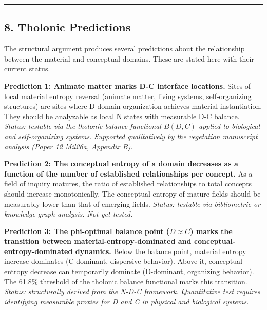 \documentclass[
  11pt,
  letterpaper,
]{article}
\begin{document}
\begin{center}\rule{0.5\linewidth}{0.5pt}\end{center}

\subsection{8. Tholonic Predictions}\label{tholonic-predictions}

The structural argument produces several predictions about the
relationship between the material and conceptual domains. These are
stated here with their current status.

\textbf{Prediction 1: Animate matter marks D-C interface locations.}
Sites of local material entropy reversal (animate matter, living
systems, self-organizing structures) are sites where D-domain
organization achieves material instantiation. They should be analyzable
as local N states with measurable D-C balance. \emph{Status: testable
via the tholonic balance functional \(B(D,C)\) applied to biological and
self-organizing systems. Supported qualitatively by the vegetation
manuscript analysis
(\href{https://github.com/baardev/truevalue/blob/main/docnav/Research/papers/12_newton-tholonic-framework/12_newton-tholonic-framework.pdf}{Paper
12}
\href{https://github.com/baardev/truevalue/blob/main/docnav/Research/papers/12_newton-tholonic-framework/12_newton-tholonic-framework.pdf}{Mil26a},
Appendix B).}

\textbf{Prediction 2: The conceptual entropy of a domain decreases as a
function of the number of established relationships per concept.} As a
field of inquiry matures, the ratio of established relationships to
total concepts should increase monotonically. The conceptual entropy of
mature fields should be measurably lower than that of emerging fields.
\emph{Status: testable via bibliometric or knowledge graph analysis. Not
yet tested.}

\textbf{Prediction 3: The phi-optimal balance point (\(D \approx C\))
marks the transition between material-entropy-dominated and
conceptual-entropy-dominated dynamics.} Below the balance point,
material entropy increase dominates (C-dominant, dispersive behavior).
Above it, conceptual entropy decrease can temporarily dominate
(D-dominant, organizing behavior). The 61.8\% threshold of the tholonic
balance functional marks this transition. \emph{Status: structurally
derived from the N-D-C framework. Quantitative test requires identifying
measurable proxies for D and C in physical and biological systems.}
\end{document}

